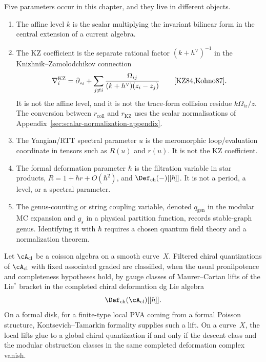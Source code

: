 \begin{convention}
\label{conv:defq-parameter-separation}
Five parameters occur in this chapter, and they live in different
objects.
\begin{enumerate}[label=\textup{(\roman*)}]
\item The affine level \(k\) is the scalar multiplying the invariant
 bilinear form in the central extension of a current algebra.
\item The KZ coefficient is the separate rational factor
 \((k+h^\vee)^{-1}\) in the Knizhnik--Zamolodchikov connection
 \[
 \nabla_i^{\mathrm{KZ}}
 =\partial_{z_i}
 +\sum_{j\ne i}\frac{\Omega_{ij}}{(k+h^\vee)(z_i-z_j)}
 \qquad\textup{\cite{KZ84,Kohno87}}.
 \]
 It is not the affine level, and it is not the trace-form collision
 residue \(k\Omega_{\mathrm{tr}}/z\).  The conversion between
 \(r_{\mathrm{coll}}\) and \(r_{\mathrm{KZ}}\) uses the scalar
 normalisations of Appendix~\ref{sec:scalar-normalization-appendix}.
\item The Yangian/RTT spectral parameter \(u\) is the meromorphic
 loop/evaluation coordinate in tensors such as \(R(u)\) and \(r(u)\).
 It is not the KZ coefficient.
\item The formal deformation parameter \(\hbar\) is the filtration
 variable in star products, \(R=1+\hbar r+O(\hbar^2)\), and
 \(\Def_{\mathrm{ch}}(-)[[\hbar]]\). It is not a period, a level, or
 a spectral parameter.
\item The genus-counting or string coupling variable, denoted
 \(q_{\mathrm{gen}}\) in the modular MC expansion and \(g_s\) in a
 physical partition function, records stable-graph genus. Identifying
 it with \(\hbar\) requires a chosen quantum field theory and a
 normalization theorem.
\end{enumerate}
\end{convention}

\begin{theorem}\label{thm:chiral-quantization}
Let $\cA_{\mathrm{cl}}$ be a coisson algebra on a smooth curve~$X$.
Filtered chiral quantizations of $\cA_{\mathrm{cl}}$ with fixed
associated graded are classified, when the usual pronilpotence and
completeness hypotheses hold, by gauge classes of Maurer--Cartan lifts
of the Lie$^*$ bracket in the completed chiral deformation dg Lie
algebra
\[
\Def_{\mathrm{ch}}(\cA_{\mathrm{cl}})[[\hbar]].
\]
On a formal disk, for a finite-type local PVA coming from a formal
Poisson structure, Kontsevich--Tamarkin formality supplies such a lift.
On a curve~$X$, the local lifts glue to a global chiral quantization
if and only if the descent class and the modular obstruction classes
in the same completed deformation complex vanish.
\end{theorem}

